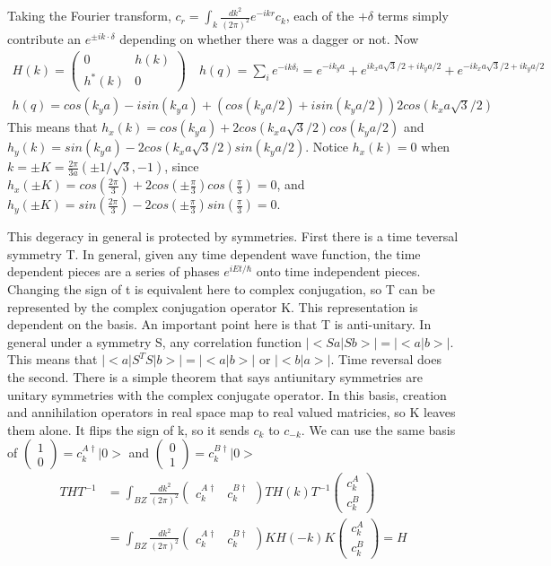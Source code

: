 Taking the Fourier transform, $c_r = \int_k \frac{dk^2}{(2\pi)^2}e^{-ikr} c_k$, each of the $+\delta$ terms simply contribute an $e^{\pm i k \cdot \delta}$ depending on whether there was a dagger or not. Now
\begin{align}
H(k)= 
\begin{pmatrix}
0 & h(k) \\
h^*(k) & 0
\end{pmatrix} \quad h(q) = \sum_i e^{-ik\delta_i} = e^{-ik_ya} + e^{ik_xa\sqrt{3}/2+ik_ya/2}+e^{-ik_xa\sqrt{3}/2+ik_ya/2} \\
h(q) = cos(k_ya)-i sin(k_ya) +(cos(k_ya/2)+i sin(k_ya/2))2cos(k_xa\sqrt{3}/2)
\end{align}
This means that $h_x(k) = cos(k_ya)+2cos(k_xa\sqrt{3}/2)cos(k_ya/2)$ and $h_y(k) = sin(k_ya)-2cos(k_xa\sqrt{3}/2)sin(k_ya/2)$. Notice $h_x(k) = 0$ when $k = \pm K = \frac{2\pi}{3a}(\pm1/\sqrt{3},-1)$, since $h_x(\pm K) = cos(\frac{2\pi}{3})+2cos(\pm\frac{\pi}{3})cos(\frac{\pi}{3})=0$, and $h_y(\pm K) = sin(\frac{2\pi}{3})-2cos(\pm\frac{\pi}{3})sin(\frac{\pi}{3})=0$.

This degeracy in general is protected by symmetries. First there is a time teversal symmetry T. In general, given any time dependent wave function, the time dependent pieces are a series of phases $e^{iEt/\hbar}$ onto time independent pieces. Changing the sign of t is equivalent here to complex conjugation, so T can be represented by the complex conjugation operator K. This representation is dependent on the basis. 
An important point here is that T is anti-unitary. In general under a symmetry S, any correlation function $|<Sa|Sb>| = |<a|b>|$. This means that $|<a|S^TS|b>| =|<a|b>|$ or $|<b|a>|$. Time reversal does the second. There is a simple theorem that says antiunitary symmetries are unitary symmetries with the complex conjugate operator. In this basis, creation and annihilation operators in real space map to real valued matricies, so K leaves them alone. It flips the sign of k, so it sends $c_k$ to $c_{-k}$. We can use the same basis of $\begin{pmatrix}
1 \\
0
\end{pmatrix} = c^{A\dag}_k|0>$ and  $\begin{pmatrix}
0 \\
1
\end{pmatrix} = c^{B\dag}_k|0>$
\begin{align}
THT^{-1}&=\int_{BZ}\frac{dk^2}{(2\pi)^2} 
\begin{pmatrix}
c^{A\dag}_k & c^{B\dag}_k
\end{pmatrix}
TH(k)T^{-1}
\begin{pmatrix}
c^{A}_k \\
c^{B}_k
\end{pmatrix}
 \\
&= \int_{BZ}\frac{dk^2}{(2\pi)^2} 
\begin{pmatrix}
c^{A\dag}_{k} & c^{B\dag}_{k}
\end{pmatrix}
KH(-k)K
\begin{pmatrix}
c^{A}_{k} \\
c^{B}_{k}
\end{pmatrix} = H
\end{align}

